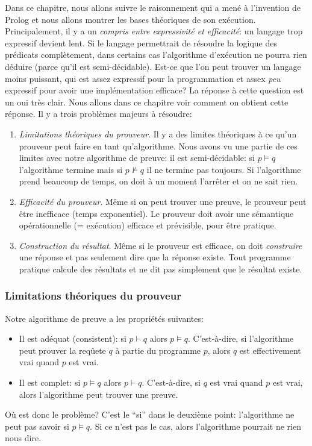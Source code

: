 Dans ce chapitre, nous allons suivre le raisonnement qui a mené à l'invention de Prolog
et nous allons montrer les bases théoriques de son exécution.
Principalement, il y a un {\em compris entre expressivité et efficacité}:
un langage trop expressif devient lent.
Si le langage permettrait de résoudre la logique des prédicats complètement,
dans certains cas l'algorithme d'exécution ne pourra rien déduire (parce qu'il est semi-décidable).
Est-ce que l'on peut trouver un langage moins puissant, qui est assez expressif pour la programmation
et assex {\em peu} expressif pour avoir une implémentation efficace?
La réponse à cette question est un oui très clair.
Nous allons dans ce chapitre voir comment on obtient cette réponse.
Il y a trois problèmes majeurs à résoudre:
\begin{enumerate}
\item {\em Limitations théoriques du prouveur}.
Il y a des limites théoriques à ce qu'un prouveur peut faire en tant qu'algorithme.
Nous avons vu une partie de ces limites avec notre algorithme de preuve:
il est semi-décidable: si $p \models q$ l'algorithme termine mais si $p \not\models q$ il ne termine pas toujours.
Si l'algorithme prend beaucoup de temps, on doit à un moment l'arrêter et on ne sait rien.
\item {\em Efficacité du prouveur}.
Même si on peut trouver une preuve, le prouveur peut être inefficace (temps exponentiel).
Le prouveur doit avoir une sémantique opérationnelle (= exécution) efficace et prévisible, pour être pratique.
\item {\em Construction du résultat}.
Même si le prouveur est efficace, on doit {\em construire} une réponse et pas seulement dire que la réponse existe.
Tout programme pratique calcule des résultats et ne dit pas simplement que le résultat existe.
\end{enumerate}

\subsubsection{Limitations théoriques du prouveur}

Notre algorithme de preuve a les propriétés suivantes:
\begin{itemize}
\item Il est adéquat (consistent): si $p \vdash q$ alors $p \models q$.
C'est-à-dire, si l'algorithme peut prouver la reqûete $q$ à partie du programme $p$,
alors $q$ est effectivement vrai quand $p$ est vrai.
\item Il est complet: si $p \models q$ alors $p \vdash q$.
C'est-à-dire, si $q$ est vrai quand $p$ est vrai, alors l'algorithme peut trouver une preuve.
\end{itemize}
Où est donc le problème?
C'est le ``si'' dans le deuxième point: l'algorithme ne peut pas savoir si $p \models q$.
Si ce n'est pas le cas, alors l'algorithme pourrait ne rien nous dire.

